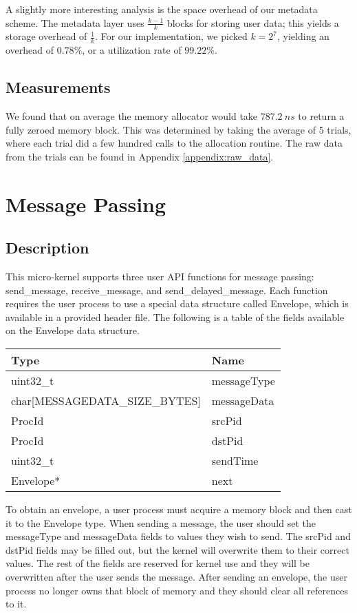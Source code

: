 \documentclass[12pt]{report}
\begin{document}
    A slightly more interesting analysis is the space overhead of our metadata
    scheme. The metadata layer uses $\frac{k-1}{k}$ blocks for storing user
    data; this yields a storage overhead of $\frac{1}{k}$. For our
    implementation, we picked $k=2^7$, yielding an overhead of $0.78\%$, or a
    utilization rate of $99.22\%$.

\section{Measurements}
    We found that on average the memory allocator
    would take $787.2 \: ns$ to return a fully zeroed memory block. This was
    determined by taking the average of 5 trials, where each trial did a few
    hundred calls to the allocation routine. The raw data from the trials can
    be found in Appendix \ref{appendix:raw_data}.

\chapter{Message Passing}

\section{Description}

    This micro-kernel supports three user API functions for message passing:
    send\_message, receive\_message, and send\_delayed\_message. Each function
    requires the user process to use a special data structure called Envelope,
    which is available in a provided header file. The following is a table of the
    fields available on the Envelope data structure.

    \begin{tabular}{l | l}
        Type & Name \\
        \hline
        uint32\_t & messageType \\
        char[MESSAGEDATA\_SIZE\_BYTES] & messageData \\
        ProcId & srcPid \\
        ProcId & dstPid \\
        uint32\_t & sendTime \\
        Envelope* & next \\
    \end{tabular}

    To obtain an envelope, a user process must acquire a memory block and then
    cast  it to the Envelope type. When sending a message, the user should set
    the messageType and messageData fields to values they wish to send. The
    srcPid and dstPid fields may be filled out, but the kernel will overwrite
    them to their correct values. The rest of the fields are reserved for kernel
    use and they will be overwritten after the user sends the message.  After
    sending an envelope, the user process no longer owns that block of memory
    and they should clear all references to it.
\end{document}
